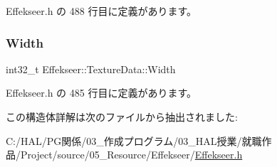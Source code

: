  Effekseer.\+h の 488 行目に定義があります。

\mbox{\label{struct_effekseer_1_1_texture_data_ab1391055f7b4bf482c89469de1061e08}} 
\subsubsection{\texorpdfstring{Width}{Width}}
{\footnotesize\ttfamily int32\+\_\+t Effekseer\+::\+Texture\+Data\+::\+Width}



 Effekseer.\+h の 485 行目に定義があります。



この構造体詳解は次のファイルから抽出されました\+:\begin{DoxyCompactItemize}
\item 
C\+:/\+H\+A\+L/\+P\+G関係/03\+\_\+作成プログラム/03\+\_\+\+H\+A\+L授業/就職作品/\+Project/source/05\+\_\+\+Resource/\+Effekseer/\mbox{\hyperlink{_effekseer_8h}{Effekseer.\+h}}\end{DoxyCompactItemize}

